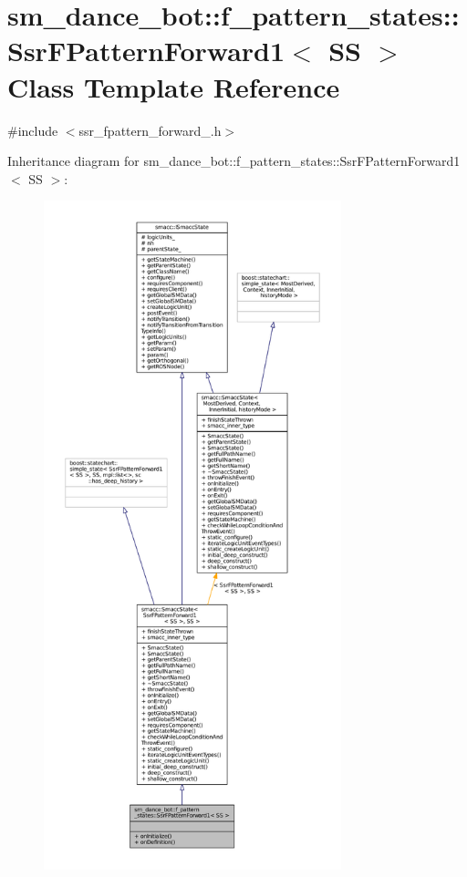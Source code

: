 \hypertarget{structsm__dance__bot_1_1f__pattern__states_1_1SsrFPatternForward1}{}\section{sm\+\_\+dance\+\_\+bot\+:\+:f\+\_\+pattern\+\_\+states\+:\+:Ssr\+F\+Pattern\+Forward1$<$ SS $>$ Class Template Reference}
\label{structsm__dance__bot_1_1f__pattern__states_1_1SsrFPatternForward1}


{\ttfamily \#include $<$ssr\+\_\+fpattern\+\_\+forward\+\_.\+h$>$}



Inheritance diagram for sm\+\_\+dance\+\_\+bot\+:\+:f\+\_\+pattern\+\_\+states\+:\+:Ssr\+F\+Pattern\+Forward1$<$ SS $>$\+:
\nopagebreak
\begin{figure}[H]
\begin{center}
\leavevmode
\includegraphics[height=550pt]{structsm__dance__bot_1_1f__pattern__states_1_1SsrFPatternForward1__inherit__graph}
\end{center}
\end{figure}


